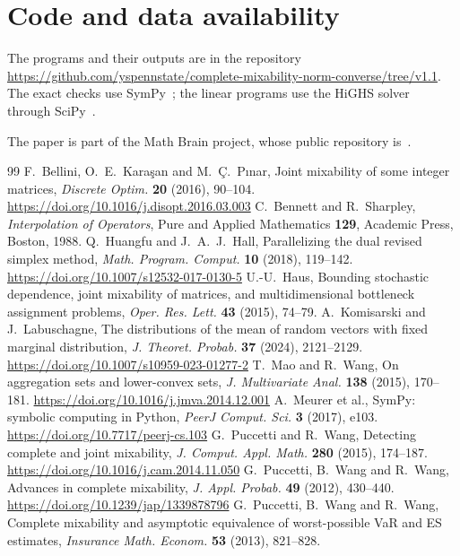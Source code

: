 \documentclass[11pt]{amsart}
\theoremstyle{definition}
\begin{document}
\section*{Code and data availability}
The programs and their outputs are in the repository
\url{https://github.com/yspennstate/complete-mixability-norm-converse/tree/v1.1}. The exact checks use SymPy~\cite{SymPy}; the linear programs use the HiGHS solver~\cite{HiGHS} through
SciPy~\cite{SciPy}.

The paper is part of the Math Brain project, whose public repository is~\cite{MathBrainRepo}.

\begin{thebibliography}{99}
 F.~Bellini, O.~E.~Karaşan and M.~Ç.~Pınar, Joint mixability of some integer matrices, \emph{Discrete
Optim.} \textbf{20} (2016), 90--104.
\url{https://doi.org/10.1016/j.disopt.2016.03.003}
 C.~Bennett and R.~Sharpley, \emph{Interpolation of Operators}, Pure and Applied Mathematics
\textbf{129}, Academic Press, Boston, 1988.
 Q.~Huangfu and J.~A.~J.~Hall, Parallelizing the dual revised simplex method, \emph{Math. Program.
Comput.} \textbf{10} (2018), 119--142.
\url{https://doi.org/10.1007/s12532-017-0130-5}
 U.-U.~Haus, Bounding stochastic dependence, joint mixability of matrices, and multidimensional
bottleneck assignment problems, \emph{Oper. Res. Lett.} \textbf{43} (2015), 74--79.
 A.~Komisarski and J.~Labuschagne, The distributions of the mean of random vectors with fixed marginal
distribution, \emph{J. Theoret. Probab.} \textbf{37} (2024), 2121--2129.
\url{https://doi.org/10.1007/s10959-023-01277-2}
 T.~Mao and R.~Wang, On aggregation sets and lower-convex sets, \emph{J. Multivariate Anal.}
\textbf{138} (2015), 170--181.
\url{https://doi.org/10.1016/j.jmva.2014.12.001}
 A.~Meurer et al., SymPy: symbolic computing in Python, \emph{PeerJ Comput. Sci.} \textbf{3} (2017),
e103.
\url{https://doi.org/10.7717/peerj-cs.103}
 G.~Puccetti and R.~Wang, Detecting complete and joint mixability, \emph{J. Comput. Appl. Math.}
\textbf{280} (2015), 174--187.
\url{https://doi.org/10.1016/j.cam.2014.11.050}
 G.~Puccetti, B.~Wang and R.~Wang, Advances in complete mixability, \emph{J. Appl. Probab.} \textbf{49}
(2012), 430--440.
\url{https://doi.org/10.1239/jap/1339878796}
 G.~Puccetti, B.~Wang and R.~Wang, Complete mixability and asymptotic equivalence of worst-possible
VaR and ES estimates, \emph{Insurance Math. Econom.} \textbf{53} (2013), 821--828.

\end{thebibliography}
\end{document}
